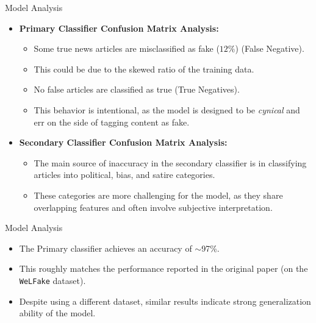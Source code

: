 \documentclass{beamer}
\begin{document}
\begin{frame}{Model Analysis}
    \begin{itemize}
        \item \textbf{Primary Classifier Confusion Matrix Analysis:}
        \begin{itemize}
            \item Some true news articles are misclassified as fake ($12\%$) (False Negative).
            \item This could be due to the skewed ratio of the training data.
            \item No false articles are classified as true (True Negatives).
            \item This behavior is intentional, as the model is designed to be \textit{cynical} and err on the side of tagging content as fake.
        \end{itemize}

        \item \textbf{Secondary Classifier Confusion Matrix Analysis:}
        \begin{itemize}
            \item The main source of inaccuracy in the secondary classifier is in classifying articles into political, bias, and satire categories.
            \item These categories are more challenging for the model, as they share overlapping features and often involve subjective interpretation.
        \end{itemize}
        
    \end{itemize}

\end{frame}

\begin{frame}{Model Analysis}
    \begin{itemize}
        \item The Primary classifier achieves an accuracy of $\sim$97\%.
        \item This roughly matches the performance reported in the original paper (on the \texttt{WeLFake} dataset).
        \item Despite using a different dataset, similar results indicate strong generalization ability of the model.
    \end{itemize}
\end{frame}
\end{document}
